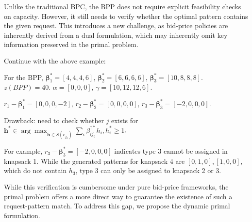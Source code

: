 



Unlike the traditional BPC, the BPP does not require explicit feasibility checks on capacity. However, it still needs to verify whether the optimal pattern contains the given request. This introduces a new challenge, as bid-price policies are inherently derived from a dual formulation, which may inherently omit key information preserved in the primal problem.

\begin{example}
Continue with the above example:

For the BPP, $\bm{\beta}_{1}^{*} = [4, 4, 4, 6]$, $\bm{\beta}_{2}^{*} = [6, 6, 6, 6]$, $\bm{\beta}_{3}^{*} = [10, 8, 8, 8]$. $z(BPP) = 40$. $\alpha = [0, 0, 0]$, $\gamma = [10, 12, 12, 6]$.

$r_{1} - \bm{\beta}_{1}^{*} = [0, 0, 0, -2]$, $r_{2} - \bm{\beta}_{2}^{*} = [0, 0, 0, 0]$, $r_{3} - \bm{\beta}_{3}^{*} = [-2, 0, 0, 0]$.

Drawback: need to check whether $j$ exists for $\bm{h}^{*} \in \arg\max_{\bm{h} \in S(c_{j_0})} \sum_{i} \beta_{ij_0}^{\dag *} h_{i}, h_{i}^{*} \geq 1$.

For example, $r_{3} - \bm{\beta}_{3}^{*} = [-2, 0, 0, 0]$ indicates type 3 cannot be assigned in knapsack 1. While the generated patterns for knapsack 4 are $[0, 1, 0], [1, 0, 0]$, which do not contain $h_{3}$, type 3 can only be assigned to knapsack 2 or 3.
\end{example}

While this verification is cumbersome under pure bid-price frameworks, the primal problem offers a more direct way to guarantee the existence of such a request-pattern match. To address this gap, we propose the dynamic primal formulation.
